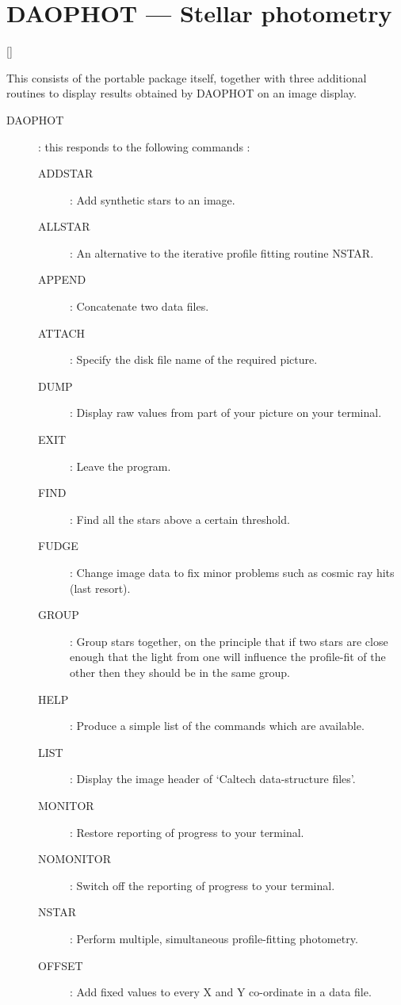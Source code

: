 \newpage

\section{DAOPHOT --- Stellar photometry}

\vspace{-10mm}

\hfill []

\vspace{2mm}

This consists of the portable package itself, together with three additional
routines to display results obtained by DAOPHOT on an image display.
\begin{description}
\item [DAOPHOT] : this responds to the following commands :
\begin{description}
\item [ADDSTAR] : Add synthetic stars to an image.
\item [ALLSTAR] : An alternative to the iterative profile fitting routine NSTAR.
\item [APPEND] : Concatenate two data files.
\item [ATTACH] : Specify the disk file name of the required picture.
\item [DUMP] : Display raw values from part of your picture on your terminal.
\item [EXIT] : Leave the program.
\item [FIND] : Find all the stars above a certain threshold.
\item [FUDGE] : Change image data to fix minor problems such as cosmic ray hits
 (last resort).
\item [GROUP] : Group stars together, on the principle that if two stars are 
 close enough that the light from one will influence the profile-fit of the
 other then they should be in the same group.
\item [HELP] : Produce a simple list of the commands which are available.
\item [LIST] : Display the image header of `Caltech data-structure files'.
\item [MONITOR] : Restore reporting of progress to your terminal.
\item [NOMONITOR] : Switch off the reporting of progress to your terminal.
\item [NSTAR] : Perform multiple, simultaneous profile-fitting photometry.
\item [OFFSET] : Add fixed values to every X and Y co-ordinate in a data file.

\end{description}
\end{description}
